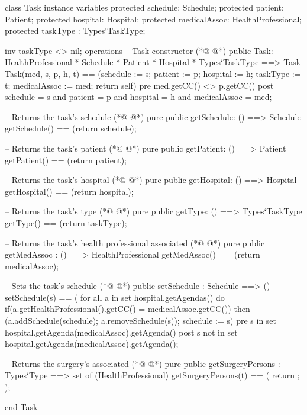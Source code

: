 \begin{vdmpp}[breaklines=true]
class Task
instance variables
  protected schedule: Schedule;
  protected patient: Patient;
  protected hospital: Hospital;
  protected medicalAssoc: HealthProfessional;
  protected taskType : Types`TaskType;

  inv taskType <> nil;
operations
 -- Task constructor
(*@
\label{Task:12}
@*)
 public Task: HealthProfessional * Schedule * Patient * Hospital * Types`TaskType ==> Task
  Task(med, s, p, h, t) == (schedule := s; patient := p; hospital := h; taskType := t; medicalAssoc := med; return self)
 pre med.getCC() <> p.getCC()
 post schedule = s and patient = p and hospital = h and medicalAssoc = med;
 
 -- Returns the task's schedule
(*@
\label{getSchedule:18}
@*)
 pure public getSchedule: () ==> Schedule
  getSchedule() == (return schedule);
 
 -- Returns the task's patient
(*@
\label{getPatient:22}
@*)
 pure public getPatient: () ==> Patient
  getPatient() == (return patient);
 
 -- Returns the task's hospital
(*@
\label{getHospital:26}
@*)
 pure public getHospital: () ==> Hospital
  getHospital() == (return hospital);
 
 -- Returns the task's type
(*@
\label{getType:30}
@*)
 pure public getType: () ==> Types`TaskType
  getType() == (return taskType);
 
 -- Returns the task's health professional associated
(*@
\label{getMedAssoc:34}
@*)
 pure public getMedAssoc : () ==> HealthProfessional
  getMedAssoc() == (return medicalAssoc);
 
 -- Sets the task's schedule
(*@
\label{setSchedule:38}
@*)
 public setSchedule : Schedule ==> ()
  setSchedule(s) == (
   for all a in set hospital.getAgendas() do
    if(a.getHealthProfessional().getCC() = medicalAssoc.getCC())
     then (a.addSchedule(schedule); a.removeSchedule(s));
   schedule := s)
 pre s in set hospital.getAgenda(medicalAssoc).getAgenda()
 post s not in set hospital.getAgenda(medicalAssoc).getAgenda();
 
 -- Returns the surgery's associated
(*@
\label{getSurgeryPersons:48}
@*)
 pure public getSurgeryPersons : Types`Type ==> set of (HealthProfessional)
  getSurgeryPersons(t) == ( return {}; );

end Task
\end{vdmpp}
\bigskip

